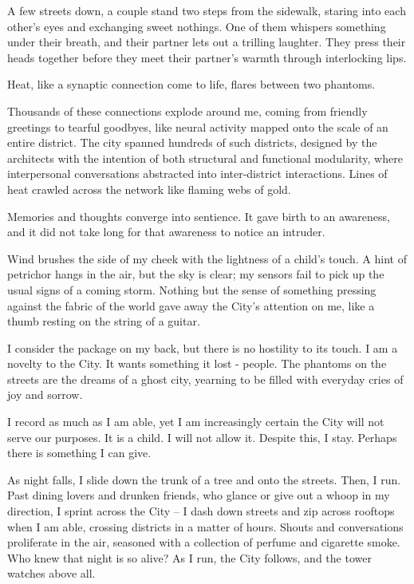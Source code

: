 A few streets down, a couple stand two steps from the sidewalk, staring into each other’s eyes and exchanging sweet nothings. One of them whispers something under their breath, and their partner lets out a trilling laughter. They press their heads together before they meet their partner’s warmth through interlocking lips.

Heat, like a synaptic connection come to life, flares between two phantoms. 

Thousands of these connections explode around me, coming from friendly greetings to tearful goodbyes, like neural activity mapped onto the scale of an entire district. The city spanned hundreds of such districts, designed by the architects with the intention of both structural and functional modularity, where interpersonal conversations abstracted into inter-district interactions. Lines of heat crawled across the network like flaming webs of gold.

Memories and thoughts converge into sentience. It gave birth to an awareness, and it did not take long for that awareness to notice an intruder.

Wind brushes the side of my cheek with the lightness of a child's touch. A hint of petrichor hangs in the air, but the sky is clear; my sensors fail to pick up the usual signs of a coming storm. Nothing but the sense of something pressing against the fabric of the world gave away the City’s attention on me, like a thumb resting on the string of a guitar. 

I consider the package on my back, but there is no hostility to its touch. I am a novelty to the City. It wants something it lost - people. The phantoms on the streets are the dreams of a ghost city, yearning to be filled with everyday cries of joy and sorrow. 

I record as much as I am able, yet I am increasingly certain the City will not serve our purposes. It is a child. I will not allow it. Despite this, I stay. Perhaps there is something I can give.

As night falls, I slide down the trunk of a tree and onto the streets. Then, I run. Past dining lovers and drunken friends, who glance or give out a whoop in my direction, I sprint across the City – I dash down streets and zip across rooftops when I am able, crossing districts in a matter of hours. Shouts and conversations proliferate in the air, seasoned with a collection of perfume and cigarette smoke. Who knew that night is so alive? As I run, the City follows, and the tower watches above all.


